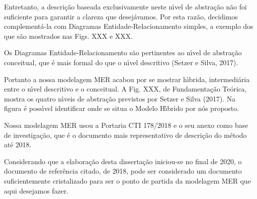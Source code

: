 \documentclass[
12pt,		%
openright,	%
twoside,  %
a4paper,			%
chapter=TITLE,		%
english,			%
french,				%
spanish,			%
brazil				%
]{USPSC-classe/USPSC}
\begin{document}
Entretanto, a descri\c{c}\~ao baseada exclusivamente neste n\'{\i}vel de abstra\c{c}\~ao n\~ao foi suficiente para garantir a clareza que desej\'avamos. Por esta raz\~ao, decidimos complement\'a-la com Diagramas Entidade-Relacionamento simples, a exemplo dos que s\~ao mostrados nas Figs. XXX e XXX.














Os Diagramas Entidade-Relacionamento s\~ao pertinentes ao n\'{\i}vel de abstra\c{c}\~ao conceitual, que \'e mais formal do que o n\'{\i}vel descritivo (Setzer e Silva, 2017).














Portanto a nossa modelagem MER acabou por se mostrar h\'{\i}brida, intermedi\'aria entre o n\'{\i}vel descritivo e o conceitual. A Fig. XXX, de Fundamenta\c{c}\~ao Te\'orica, mostra os quatro n\'{\i}veis de abstra\c{c}\~ao previstos por  Setzer e Silva (2017). Na figura \'e poss\'{\i}vel identificar onde se situa o Modelo H\'{\i}brido por n\'os proposto.














Nossa modelagem MER usou a Portaria CTI 178/2018 e o seu anexo como base de investiga\c{c}\~ao, que \'e o documento mais representativo de descri\c{c}\~ao do m\'etodo at\'e 2018.














Considerando que a elabora\c{c}\~ao desta disserta\c{c}\~ao iniciou-se no final de 2020, o documento de refer\^encia citado, de 2018, pode ser considerado um documento suficientemente cristalizado para ser o ponto de partida da modelagem MER que aqui desejamos fazer.
\end{document}
